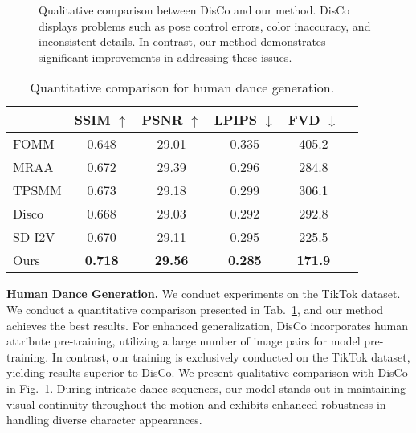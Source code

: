 \begin{figure}[!t]
\begin{center}
	\setlength{\fboxrule}{0pt}
\end{center}
\vspace{-0.6cm}
\caption{Qualitative comparison between DisCo and our method. DisCo displays problems such as pose control errors, color inaccuracy, and inconsistent details. In contrast, our method demonstrates significant improvements in addressing these issues.}
\vspace{-0.2cm}
\label{fig:disco}
\end{figure}

\begin{table}
	\centering
\begin{center}
\begin{tabular}{lccccc} 

\hline
    & SSIM $\uparrow$ & PSNR $\uparrow$ & LPIPS $\downarrow$ & FVD $\downarrow$ \\
 \hline
FOMM\cite{fomm}  & 0.648 & 29.01 & 0.335 & 405.2 \\
MRAA\cite{mraa} & 0.672 & 29.39 & 0.296 & 284.8 \\
TPSMM\cite{tpsmm} & 0.673 & 29.18 & 0.299 & 306.1 \\
Disco\cite{disco} & 0.668 & 29.03 & 0.292 & 292.8 \\
SD-I2V & 0.670 & 29.11 & 0.295 & 225.5 \\
Ours & \textbf{0.718} & \textbf{29.56} & \textbf{0.285} & \textbf{171.9} \\
 
\hline
\end{tabular}
\end{center}    \vspace{-0.5cm}
	\caption{Quantitative comparison for human dance generation.}
    \vspace{-0.3cm}
	\label{table:tiktok}
\end{table}

\noindent
\textbf{Human Dance Generation. }
We conduct experiments on the TikTok dataset. 
We conduct a quantitative comparison presented in Tab.~\ref{table:tiktok}, and our method achieves the best results.
For enhanced generalization, DisCo incorporates human attribute pre-training, utilizing a large number of image pairs for model pre-training. In contrast, our training is exclusively conducted on the TikTok dataset, yielding results superior to DisCo. 
We present qualitative comparison with DisCo in Fig.~\ref{fig:disco}. 
During intricate dance sequences, our model stands out in maintaining visual continuity throughout the motion and exhibits enhanced robustness in handling diverse character appearances.


